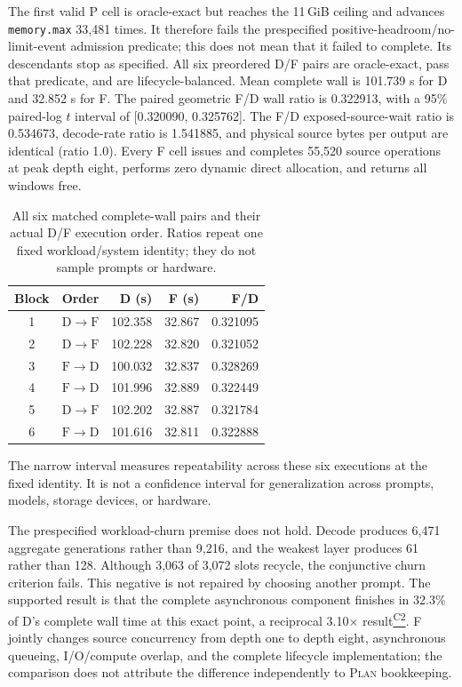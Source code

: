 \documentclass[letterpaper,twocolumn,10pt]{article}
\newcommand{\Plan}{\textsc{Plan}\xspace}
\newcommand{\GiB}{\,GiB\xspace}
\newcommand{\claimref}[1]{\hyperlink{claim:#1}{\textsuperscript{\textsf{#1}}}}
\begin{document}
The first valid P cell is oracle-exact but reaches the 11\GiB ceiling and
advances \texttt{memory.max} 33,481 times.  It therefore fails the
prespecified positive-headroom/no-limit-event admission predicate; this does
not mean that it failed to complete.  Its descendants stop as specified.  All
six preordered D/F pairs are oracle-exact, pass that predicate, and are
lifecycle-balanced.  Mean complete wall is 101.739 s for D and 32.852 s for F.
The paired geometric F/D wall ratio is 0.322913, with a 95\% paired-log $t$
interval of [0.320090, 0.325762].  The F/D exposed-source-wait ratio is 0.534673,
decode-rate ratio is 1.541885, and physical source bytes per output are
identical (ratio 1.0).  Every F cell issues and completes 55,520 source
operations at peak depth eight, performs zero dynamic direct allocation, and
returns all windows free.

\begin{table}[t]
  \centering
  \footnotesize
  \renewcommand{\arraystretch}{1.08}
  \caption{All six matched complete-wall pairs and their actual D/F execution
  order.  Ratios repeat one fixed workload/system identity; they do not sample
  prompts or hardware.}
  \label{tab:matchedpairs}
  \begin{tabular}{@{}crrrr@{}}
    \toprule
    Block & Order & D (s) & F (s) & F/D \\
    \midrule
    1 & $\mathrm{D}\!\rightarrow\!\mathrm{F}$ & 102.358 & 32.867 & 0.321095 \\
    2 & $\mathrm{D}\!\rightarrow\!\mathrm{F}$ & 102.228 & 32.820 & 0.321052 \\
    3 & $\mathrm{F}\!\rightarrow\!\mathrm{D}$ & 100.032 & 32.837 & 0.328269 \\
    4 & $\mathrm{F}\!\rightarrow\!\mathrm{D}$ & 101.996 & 32.889 & 0.322449 \\
    5 & $\mathrm{D}\!\rightarrow\!\mathrm{F}$ & 102.202 & 32.887 & 0.321784 \\
    6 & $\mathrm{F}\!\rightarrow\!\mathrm{D}$ & 101.616 & 32.811 & 0.322888 \\
    \bottomrule
  \end{tabular}
\end{table}

The narrow interval measures repeatability across these six executions at the
fixed identity.  It is not a confidence interval for generalization across
prompts, models, storage devices, or hardware.

The prespecified workload-churn premise does not hold.  Decode produces 6,471
aggregate generations rather than 9,216, and the weakest layer produces 61
rather than 128.  Although 3,063 of 3,072 slots recycle, the conjunctive churn
criterion fails.  This negative is not repaired by choosing another prompt.
The supported result is that the complete asynchronous component finishes in
32.3\% of D's complete wall time at this exact point, a reciprocal
3.10$\times$ result\claimref{C2}.  F jointly changes source concurrency from
depth one to depth eight, asynchronous queueing, I/O/compute overlap, and the
complete lifecycle implementation; the comparison does not attribute the
difference independently to \Plan bookkeeping.
\end{document}
